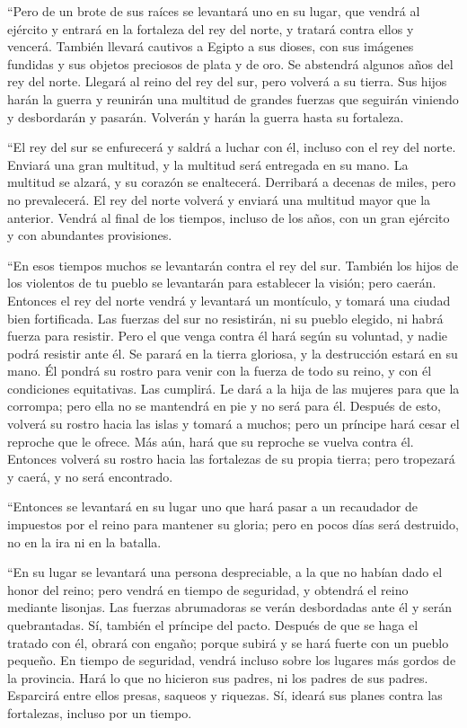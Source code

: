  ``Pero de un brote de sus raíces se levantará uno en su
lugar, que vendrá al ejército y entrará en la fortaleza del rey del
norte, y tratará contra ellos y vencerá.  También llevará
cautivos a Egipto a sus dioses, con sus imágenes fundidas y sus objetos
preciosos de plata y de oro. Se abstendrá algunos años del rey del
norte.  Llegará al reino del rey del sur, pero volverá a
su tierra.  Sus hijos harán la guerra y reunirán una
multitud de grandes fuerzas que seguirán viniendo y desbordarán y
pasarán. Volverán y harán la guerra hasta su fortaleza.

 ``El rey del sur se enfurecerá y saldrá a luchar con él,
incluso con el rey del norte. Enviará una gran multitud, y la multitud
será entregada en su mano.  La multitud se alzará, y su
corazón se enaltecerá. Derribará a decenas de miles, pero no
prevalecerá.  El rey del norte volverá y enviará una
multitud mayor que la anterior. Vendrá al final de los tiempos, incluso
de los años, con un gran ejército y con abundantes provisiones.

 ``En esos tiempos muchos se levantarán contra el rey del
sur. También los hijos de los violentos de tu pueblo se levantarán para
establecer la visión; pero caerán.  Entonces el rey del
norte vendrá y levantará un montículo, y tomará una ciudad bien
fortificada. Las fuerzas del sur no resistirán, ni su pueblo elegido, ni
habrá fuerza para resistir.  Pero el que venga contra él
hará según su voluntad, y nadie podrá resistir ante él. Se parará en la
tierra gloriosa, y la destrucción estará en su mano.  Él
pondrá su rostro para venir con la fuerza de todo su reino, y con él
condiciones equitativas. Las cumplirá. Le dará a la hija de las mujeres
para que la corrompa; pero ella no se mantendrá en pie y no será para
él.  Después de esto, volverá su rostro hacia las islas y
tomará a muchos; pero un príncipe hará cesar el reproche que le ofrece.
Más aún, hará que su reproche se vuelva contra él. 
Entonces volverá su rostro hacia las fortalezas de su propia tierra;
pero tropezará y caerá, y no será encontrado.

 ``Entonces se levantará en su lugar uno que hará pasar a
un recaudador de impuestos por el reino para mantener su gloria; pero en
pocos días será destruido, no en la ira ni en la batalla.

 ``En su lugar se levantará una persona despreciable, a
la que no habían dado el honor del reino; pero vendrá en tiempo de
seguridad, y obtendrá el reino mediante lisonjas.  Las
fuerzas abrumadoras se verán desbordadas ante él y serán quebrantadas.
Sí, también el príncipe del pacto.  Después de que se
haga el tratado con él, obrará con engaño; porque subirá y se hará
fuerte con un pueblo pequeño.  En tiempo de seguridad,
vendrá incluso sobre los lugares más gordos de la provincia. Hará lo que
no hicieron sus padres, ni los padres de sus padres. Esparcirá entre
ellos presas, saqueos y riquezas. Sí, ideará sus planes contra las
fortalezas, incluso por un tiempo.


